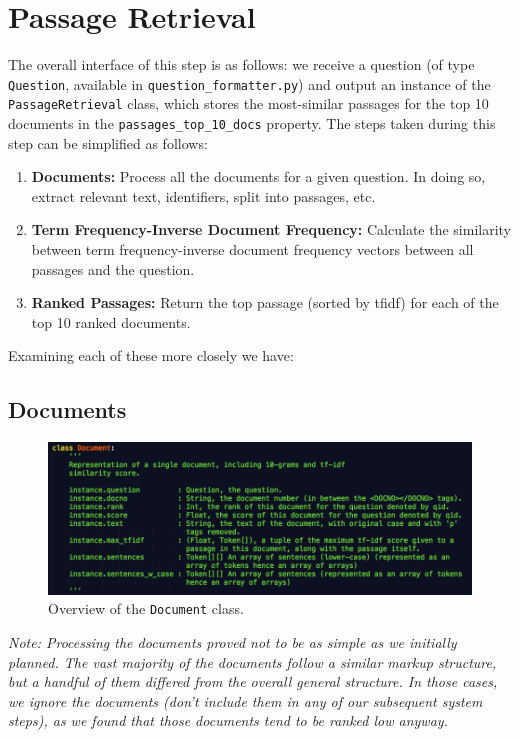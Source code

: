\documentclass{article}
\begin{document}
\section{Passage Retrieval}
The overall interface of this step is as follows: we receive a question (of type \texttt{Question}, available in \texttt{question\_formatter.py}) and output an instance of the \texttt{PassageRetrieval} class, which stores the most-similar passages for the top 10 documents in the \texttt{passages\_top\_10\_docs} property.
The steps taken during this step can be simplified as follows:
\begin{enumerate}
\item \textbf{Documents:} Process all the documents for a given question. In doing so, extract relevant text, identifiers, split into passages, etc.
\item \textbf{Term Frequency-Inverse Document Frequency:} Calculate the similarity between term frequency-inverse document frequency vectors between all passages and the question.
\item \textbf{Ranked Passages: }Return the top passage (sorted by tfidf) for each of the top 10 ranked documents.
\end{enumerate}

Examining each of these more closely we have:\\
\subsection{Documents}
\begin{figure}[h]
    \centering
    \includegraphics[width=1.0\textwidth]{images/document.png}
    \caption{Overview of the \texttt{Document} class.}
\end{figure}
\textit{Note: Processing the documents proved not to be as simple as we initially planned. The vast majority of the documents follow a similar markup structure, but a handful of them differed from the overall general structure. In those cases, we ignore the documents (don't include them in any of our subsequent system steps), as we found that those documents tend to be ranked low anyway.}\\
\end{document}

